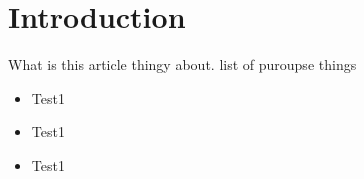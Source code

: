 \section{Introduction}

What is this article thingy about.
list of puroupse things

\begin{itemize}
  \item Test1
  \item Test1
  \item Test1
\end{itemize}


\clearpage

